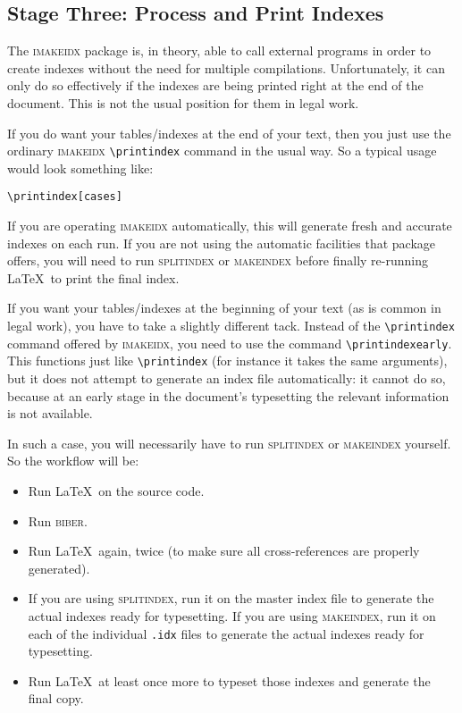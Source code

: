 \documentclass[a5paper,fontsize=9pt,DIV=1]{scrartcl}
\newcounter{egcounter}\setcounter{egcounter}{0}
\newenvironment{bibexample}[1][]{%
  \medskip\par\small\noindent\ignorespaces
  \marginpar{[\refstepcounter{egcounter}\arabic{egcounter}]\label{#1}}
  \begin{minipage}[t]{0.95\linewidth}}
 {\end{minipage}\par\medskip}
\begin{document}
\subsection{Stage Three: Process and Print Indexes}

The \textsc{imakeidx} package is, in theory, able to call external
programs in order to create indexes without the need for multiple
compilations. Unfortunately, it can only do so effectively if the
indexes are being printed right at the end of the document. This is
not the usual position for them in legal work.

If you do want your tables\slash indexes at the end of your text, then
you just use the ordinary \textsc{imakeidx} \verb|\printindex| command
 in the
usual way. So a typical usage would look something like:
\begin{bibexample}[printindex:1]
\begin{verbatim}
\printindex[cases]
\end{verbatim}
\end{bibexample}

If you are operating \textsc{imakeidx} automatically, this will
generate fresh and accurate indexes on each run. If you are not using
the automatic facilities that package offers, you will need to run
\textsc{splitindex} or \textsc{makeindex} before finally re-running
\LaTeX\ to print the final index.

If you want your tables\slash indexes at the beginning of your text
(as is common in legal work), you have to take a slightly different
tack. Instead of the \verb|\printindex| command offered by
\textsc{imakeidx}, you need to use the command
\verb|\printindexearly|. This functions just like \verb|\printindex|
(for instance it takes the same arguments), but it does not attempt to
generate an index file automatically: it cannot do so, because at an
early stage in the document's typesetting the relevant information is
not available.

In such a case, you will necessarily have to run \textsc{splitindex}
or \textsc{makeindex} yourself. So the workflow will be:
\begin{itemize}
\item Run \LaTeX\ on the source code.
\item Run \textsc{biber}.
\item Run \LaTeX\ again, twice (to make sure all cross-references are properly generated).
\item If you are using \textsc{splitindex}, run it on the master index
  file to generate the actual indexes ready for typesetting. If you
  are using \textsc{makeindex}, run it on each of the individual
  \texttt{.idx} files to generate the actual indexes ready for typesetting.
\item Run \LaTeX\ at least once more to typeset those indexes and
  generate the final copy.
\end{itemize}
\end{document}
